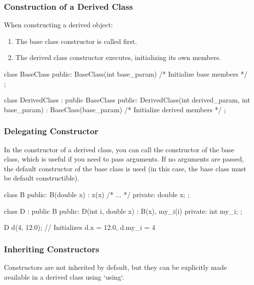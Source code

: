 \subsubsection{Construction of a Derived Class}

When constructing a derived object:

\begin{enumerate}
    \item The base class constructor is called first.
    \item The derived class constructor executes, initializing its own members.
\end{enumerate}

\begin{codeblock}[language=C++, numbers=none]
class BaseClass {
public:
    BaseClass(int base_param) { /* Initialize base members */ }
};

class DerivedClass : public BaseClass {
public:
    DerivedClass(int derived_param, int base_param) 
        : BaseClass(base_param) { /* Initialize derived members */ }
};
\end{codeblock}

\subsubsection{Delegating Constructor}

In the constructor of a derived class, you can call the constructor of the base class, which is useful if you need to pass arguments. If no arguments are passed, the default constructor of the base class is used (in this case, the base class must be default constructible).

\begin{codeblock}[language=C++]
class B {
public:
    B(double x) : x(x) { /* ... */ }
private:
    double x;
};

class D : public B {
public:
    D(int i, double x) : B(x), my_i(i) { }
private:
    int my_i;
};

D d(4, 12.0); // Initializes d.x = 12.0, d.my_i = 4
\end{codeblock}

\subsubsection{Inheriting Constructors}

Constructors are not inherited by default, but they can be explicitly made available in a derived class using `using`.

